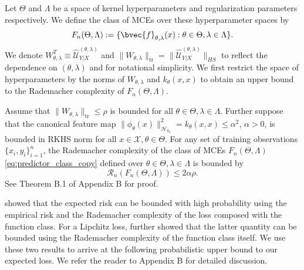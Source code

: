 \documentclass{llncs}
\begin{document}
	Let $\Theta$ and $\Lambda$ be a space of kernel hyperparameters and regularization parameters respectively. We define the class of \glspl{MCE} over these hyperparameter spaces by	
	\begin{equation}
	F_{n}(\Theta, \Lambda) := \{ \bvec{f}_{\theta, \lambda}(x) : \theta \in \Theta, \lambda \in \Lambda \}.
	\label{eq:predictor_class_copy}
	\end{equation}
	We denote $W_{\theta, \lambda}^{T} \equiv \hat{\mathcal{U}}^{(\theta, \lambda)}_{Y | X}$ and $\| W_{\theta, \lambda} \|_{\mathrm{tr}} = \| \hat{\mathcal{U}}^{(\theta, \lambda)}_{Y | X} \|_{HS}$ to reflect the dependence on $(\theta, \lambda)$ and for notational simplicity. We first restrict the space of hyperparameters by the norms of $W_{\theta, \lambda}$ and $k_{\theta}(x, x)$ to obtain an upper bound to the Rademacher complexity of $F_{n}(\Theta, \Lambda)$.
	
	
	\begin{theorem}
		\label{thm:rademacher_complexity_bound_copy}
		Assume that $\| W_{\theta, \lambda} \|_{\mathrm{tr}} \leq \rho$ is bounded for all $\theta \in \Theta, \lambda \in \Lambda$. Further suppose that the canonical feature map $\| \phi_{\theta}(x) \|_{\mathcal{H}_{k_{\theta}}}^{2} = k_{\theta}(x, x) \leq \alpha^{2}$, $\alpha > 0$, is bounded in \gls{RKHS} norm for all $x \in \mathcal{X}, \theta \in \Theta$. For any set of training observations $\{x_{i}, y_{i}\}_{i = 1}^{n}$, the Rademacher complexity of the class of \glspl{MCE} $F_{n}(\Theta, \Lambda)$ \eqref{eq:predictor_class_copy} defined over $\theta \in \Theta, \lambda \in \Lambda$ is bounded by
		\begin{equation}
		\mathcal{R}_{n}(F_{n}(\Theta, \Lambda)) \leq 2 \alpha \rho.
		\label{eq:rademacher_complexity_bound_copy}
		\end{equation}
		See Theorem B.1 of Appendix B for proof.
	\end{theorem}
	
	\cite{bartlett2002rademacher} showed that the expected risk can be bounded with high probability using the empirical risk and the Rademacher complexity of the loss composed with the function class. For a Lipchitz loss, \citet{ledoux2013probability} further showed that the latter quantity can be bounded using the Rademacher complexity of the function class itself. We use these two results to arrive at the following probabilistic upper bound to our expected loss. We refer the reader to Appendix B for detailed discussion.
	
\end{document}
